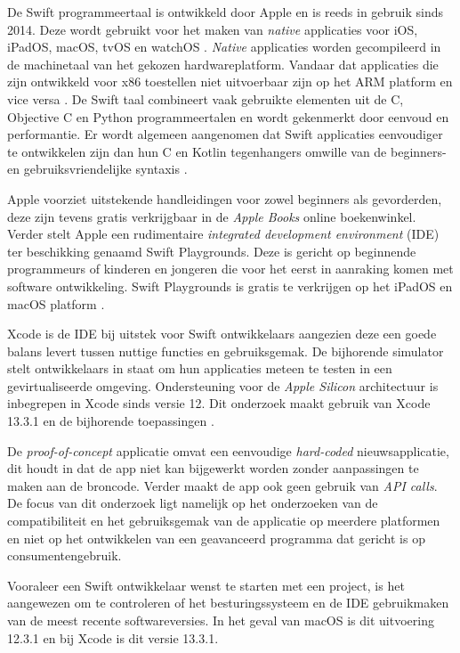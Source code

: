 De Swift programmeertaal is ontwikkeld door Apple en is reeds in gebruik sinds 2014. Deze wordt gebruikt voor het maken van \textit{native} applicaties voor iOS, iPadOS, macOS, tvOS en watchOS \autocite{AppleDeveloper2022b}. \textit{Native} applicaties worden gecompileerd in de machinetaal van het gekozen hardwareplatform. Vandaar dat applicaties die zijn ontwikkeld voor x86 toestellen niet uitvoerbaar zijn op het ARM platform en vice versa \autocite{Gillis2022}. De Swift taal combineert vaak gebruikte elementen uit de C, Objective C en Python programmeertalen en wordt gekenmerkt door eenvoud en performantie. Er wordt algemeen aangenomen dat Swift applicaties eenvoudiger te ontwikkelen zijn dan hun C en Kotlin tegenhangers omwille van de beginners- en gebruiksvriendelijke syntaxis \autocite{AppleDeveloper2022b}.

Apple voorziet uitstekende handleidingen voor zowel beginners als gevorderden, deze zijn tevens gratis verkrijgbaar in de \textit{Apple Books} online boekenwinkel. Verder stelt Apple een rudimentaire \textit{integrated development environment} (IDE) ter beschikking genaamd Swift Playgrounds. Deze is gericht op beginnende programmeurs of kinderen en jongeren die voor het eerst in aanraking komen met software ontwikkeling. Swift Playgrounds is gratis te verkrijgen op het iPadOS en macOS platform \autocite{AppleDeveloper2022b}.

Xcode is de IDE bij uitstek voor Swift ontwikkelaars aangezien deze een goede balans levert tussen nuttige functies en gebruiksgemak. De bijhorende simulator stelt ontwikkelaars in staat om hun applicaties meteen te testen in een gevirtualiseerde omgeving. Ondersteuning voor de \textit{Apple Silicon} architectuur is inbegrepen in Xcode sinds versie 12. Dit onderzoek maakt gebruik van Xcode 13.3.1 en de bijhorende toepassingen \autocite{AppleDeveloper2022a}.

De \textit{proof-of-concept} applicatie omvat een eenvoudige \textit{hard-coded} nieuwsapplicatie, dit houdt in dat de app niet kan bijgewerkt  worden zonder aanpassingen te maken aan de broncode. Verder maakt de app ook geen gebruik van \textit{API calls}. De focus van dit onderzoek ligt namelijk op het onderzoeken van de compatibiliteit en het gebruiksgemak van de applicatie op meerdere platformen en niet op het ontwikkelen van een geavanceerd programma dat gericht is op consumentengebruik.

Vooraleer een Swift ontwikkelaar wenst te starten met een project, is het aangewezen om te controleren of het besturingssysteem en de IDE gebruikmaken van de meest recente softwareversies. In het geval van macOS is dit uitvoering 12.3.1 en bij Xcode is dit versie 13.3.1.

